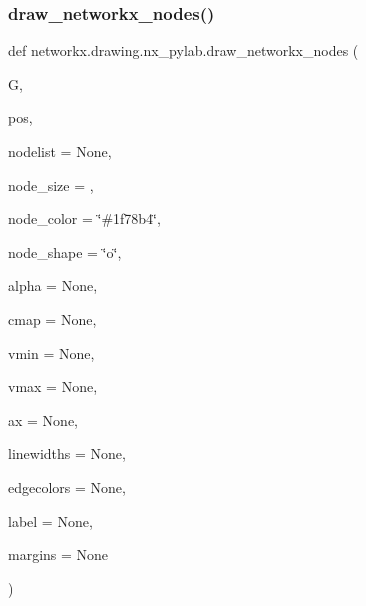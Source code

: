 \subsubsection{\texorpdfstring{draw\+\_\+networkx\+\_\+nodes()}{draw\_networkx\_nodes()}}
{\footnotesize\ttfamily def networkx.\+drawing.\+nx\+\_\+pylab.\+draw\+\_\+networkx\+\_\+nodes (\begin{DoxyParamCaption}\item[{}]{G,  }\item[{}]{pos,  }\item[{}]{nodelist = {\ttfamily None},  }\item[{}]{node\+\_\+size = {},  }\item[{}]{node\+\_\+color = {\ttfamily \char`\"{}\#1f78b4\char`\"{}},  }\item[{}]{node\+\_\+shape = {\ttfamily \char`\"{}o\char`\"{}},  }\item[{}]{alpha = {\ttfamily None},  }\item[{}]{cmap = {\ttfamily None},  }\item[{}]{vmin = {\ttfamily None},  }\item[{}]{vmax = {\ttfamily None},  }\item[{}]{ax = {\ttfamily None},  }\item[{}]{linewidths = {\ttfamily None},  }\item[{}]{edgecolors = {\ttfamily None},  }\item[{}]{label = {\ttfamily None},  }\item[{}]{margins = {\ttfamily None} }\end{DoxyParamCaption})}

